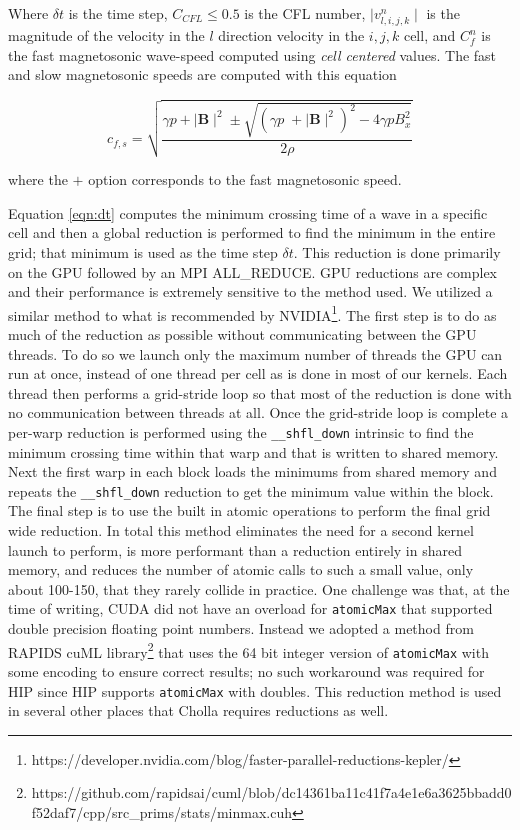 Where $\delta t$ is the time step, $C_{CFL} \leq 0.5$ is the CFL number, $\mid v^n_{l,i,j,k}\mid $ is the magnitude of the velocity in the $l$ direction velocity in the ${i,j,k}$ cell, and $C^n_f $ is the fast magnetosonic wave-speed computed using \emph{cell centered} values. The fast and slow magnetosonic speeds are computed with this equation

\begin{equation}
    c_{f,s} = \sqrt{\frac
    {\gamma p + \mid \boldsymbol{B} \mid^2 \pm \sqrt{\left( \gamma p \;+ \mid \boldsymbol{B} \mid^2 \right)^2 - 4\gamma p B_x^2 } }
    {2\rho}}
\end{equation}

where the $+$ option corresponds to the fast magnetosonic speed.

Equation \ref{eqn:dt} computes the minimum crossing time of a wave in a specific cell and then a global reduction is performed to find the minimum in the entire grid; that minimum is used as the time step $\delta t$. This reduction is done primarily on the GPU followed by an MPI ALL\_REDUCE. GPU reductions are complex and their performance is extremely sensitive to the method used. We utilized a similar method to what is recommended by NVIDIA\footnote{https://developer.nvidia.com/blog/faster-parallel-reductions-kepler/}. The first step is to do as much of the reduction as possible without communicating between the GPU threads. To do so we launch only the maximum number of threads the GPU can run at once, instead of one thread per cell as is done in most of our kernels. Each thread then performs a grid-stride loop so that most of the reduction is done with no communication between threads at all. Once the grid-stride loop is complete a per-warp reduction is performed using the \texttt{\_\_shfl\_down} intrinsic to find the minimum crossing time within that warp and that is written to shared memory. Next the first warp in each block loads the minimums from shared memory and repeats the \texttt{\_\_shfl\_down} reduction to get the minimum value within the block. The final step is to use the built in atomic operations to perform the final grid wide reduction. In total this method eliminates the need for a second kernel launch to perform, is more performant than a reduction entirely in shared memory, and reduces the number of atomic calls to such a small value, only about 100-150, that they rarely collide in practice. One challenge was that, at the time of writing, CUDA did not have an overload for \texttt{atomicMax} that supported double precision floating point numbers. Instead we adopted a method from RAPIDS cuML library\footnote{https://github.com/rapidsai/cuml/blob/dc14361ba11c41f7a4e1e6a3625bbadd0f52daf7/cpp/src\_prims/stats/minmax.cuh} that uses the 64 bit integer version of \texttt{atomicMax} with some encoding to ensure correct results; no such workaround was required for HIP since HIP supports \texttt{atomicMax} with doubles. This reduction method is used in several other places that Cholla requires reductions as well.

